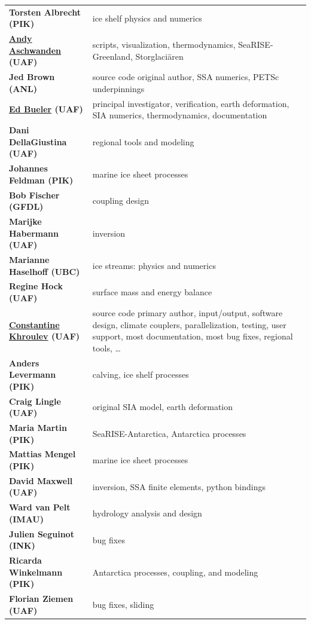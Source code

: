 \documentclass[titlepage,letterpaper,final]{scrartcl}
\begin{document}
\renewcommand{\arraystretch}{1.3}
\begin{tabular}{ll}
\textbf{Torsten Albrecht (PIK)} & ice shelf physics and numerics \\
\textbf{\underline{Andy Aschwanden} (UAF)} & \begin{minipage}[t]{4in} scripts, visualization, thermodynamics, SeaRISE-Greenland, Storglaci\"aren  \end{minipage}  \\
\textbf{Jed Brown (ANL)} & source code original author, SSA numerics, PETSc underpinnings \\
\textbf{\underline{Ed Bueler} (UAF)} & \begin{minipage}[t]{4in} principal investigator, verification, earth deformation, SIA numerics, thermodynamics, documentation  \end{minipage} \\
\textbf{Dani DellaGiustina (UAF)} & regional tools and modeling \\
\textbf{Johannes Feldman (PIK)} & marine ice sheet processes \\
\textbf{Bob Fischer (GFDL)} & coupling design \\
\textbf{Marijke Habermann (UAF)} & inversion\\
\textbf{Marianne Haselhoff (UBC)} & ice streams: physics and numerics\\
\textbf{Regine Hock (UAF)} & surface mass and energy balance \\
\textbf{\underline{Constantine Khroulev} (UAF)} & \begin{minipage}[t]{4in} source code primary author, input/output, software design, climate couplers, parallelization, testing, user support, most documentation, most bug fixes, regional tools, \dots \end{minipage} \\
\textbf{Anders Levermann (PIK)} & calving, ice shelf processes \\
\textbf{Craig Lingle (UAF)} & original SIA model, earth deformation \\
\textbf{Maria Martin (PIK)} & SeaRISE-Antarctica, Antarctica processes \\
\textbf{Mattias Mengel (PIK)} & marine ice sheet processes \\
\textbf{David Maxwell (UAF)} & inversion, SSA finite elements, python bindings \\
\textbf{Ward van Pelt (IMAU)} & hydrology analysis and design \\
\textbf{Julien Seguinot (INK)} & bug fixes \\
\textbf{Ricarda Winkelmann (PIK)} & Antarctica processes, coupling, and modeling  \\
\textbf{Florian Ziemen (UAF)} & bug fixes, sliding \\
\end{tabular}
\end{document}
